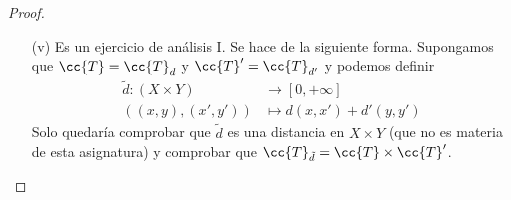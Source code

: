 \begin{prop}
\begin{proof}
\begin{itemize}
\begin{itemize}
                \item[(v)] Es un ejercicio de análisis I. Se hace de la siguiente forma. Supongamos que $\cc{T}=\cc{T}_d$ y $\cc{T}'=\cc{T}_{d'}$ y podemos definir
                \begin{align*}
                    \tilde{d} :(X\times Y) &\to [0,+\infty]\\
                    ((x,y),(x',y')) & \mapsto d(x,x') + d'(y,y')
                \end{align*}
                Solo quedaría comprobar que $\tilde{d}$ es una distancia en $X\times Y$ (que no es materia de esta asignatura) y comprobar que $\cc{T}_{\tilde{d}} = \cc{T}\times \cc{T}'$.
            \end{itemize}
        \end{itemize}
    \end{proof}
\end{prop}